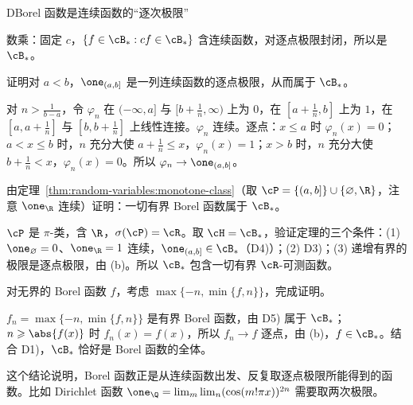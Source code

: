 \begin{probleme}{D}{Borel 函数是连续函数的“逐次极限”}
\begin{questions}
\begin{solution}
数乘：固定 $c$，$\{f\in\cB_\ast:cf\in\cB_\ast\}$ 含连续函数，对逐点极限封闭，所以是 $\cB_\ast$。
\end{solution}
\item 证明对 $a<b$，$\one_{(a,b]}$ 是一列连续函数的逐点极限，从而属于 $\cB_\ast$。
\begin{solution}
对 $n>\frac1{b-a}$，令 $\varphi_n$ 在 $(-\infty,a]$ 与 $[b+\frac1n,\infty)$ 上为 $0$，在 $[a+\frac1n,b]$ 上为 $1$，在 $[a,a+\frac1n]$ 与 $[b,b+\frac1n]$ 上线性连接。$\varphi_n$ 连续。逐点：$x\leqslant a$ 时 $\varphi_n(x)=0$；$a<x\leqslant b$ 时，$n$ 充分大使 $a+\frac1n\leqslant x$，$\varphi_n(x)=1$；$x>b$ 时，$n$ 充分大使 $b+\frac1n<x$，$\varphi_n(x)=0$。所以 $\varphi_n\to\one_{(a,b]}$。
\end{solution}
\item 由定理~\ref{thm:random-variables:monotone-class}（取 $\cP=\{(a,b]\}\cup\{\varnothing,\R\}$，注意 $\one_\R$ 连续）证明：一切有界 Borel 函数属于 $\cB_\ast$。
\begin{solution}
$\cP$ 是 $\pi$-类，含 $\R$，$\sigma(\cP)=\cR$。取 $\cH=\cB_\ast$，验证定理的三个条件：(1) $\one_\varnothing=0$、$\one_\R=1$ 连续，$\one_{(a,b]}\in\cB_\ast$（D4)）；(2) D3)；(3) 递增有界的极限是逐点极限，由 (b)。所以 $\cB_\ast$ 包含一切有界 $\cR$-可测函数。
\end{solution}
\item 对无界的 Borel 函数 $f$，考虑 $\max\{-n,\min\{f,n\}\}$，完成证明。
\begin{solution}
$f_n=\max\{-n,\min\{f,n\}\}$ 是有界 Borel 函数，由 D5) 属于 $\cB_\ast$；$n\geqslant\abs{f(x)}$ 时 $f_n(x)=f(x)$，所以 $f_n\to f$ 逐点，由 (b)，$f\in\cB_\ast$。结合 D1)，$\cB_\ast$ 恰好是 Borel 函数的全体。

这个结论说明，Borel 函数正是从连续函数出发、反复取逐点极限所能得到的函数。比如 Dirichlet 函数 $\one_\Q=\lim_m\lim_n(\cos(m!\pi x))^{2n}$ 需要取两次极限。
\end{solution}
\end{questions}
\end{probleme}

\thinkingpart

